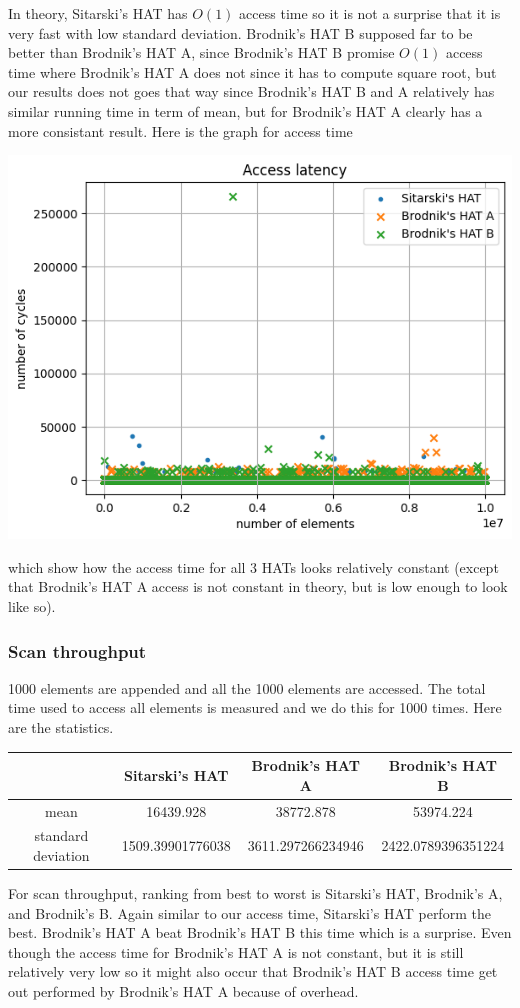 \documentclass{article} %
\begin{document}
    In theory, Sitarski's HAT has $O(1)$ access time so it is not a surprise that it is very fast with low standard deviation.
    Brodnik's HAT B supposed far to be better than Brodnik's HAT A, since Brodnik's HAT B promise $O(1)$ access time where
    Brodnik's HAT A does not since it has to compute square root, but our results does not goes that way since Brodnik's HAT B and A
    relatively has similar running time in term of mean, but for Brodnik's HAT A clearly has a more consistant result.
    Here is the graph for access time
    \begin{center}
        \includegraphics{graphics/hat_access.png}
    \end{center}
    which show how the access time for all 3 HATs looks relatively constant (except that Brodnik's HAT A access is not constant in theory, but is low enough to look like so).

    \subsubsection*{Scan throughput}
    1000 elements are appended and all the 1000 elements are accessed. The total time used to access all elements is measured and we do this for 1000 times.
    Here are the statistics.
    \begin{center}
        \begin{tabular}{|c|c|c|c|}\hline
        & Sitarski's HAT & Brodnik's HAT A & Brodnik's HAT B\\\hline
        mean &  16439.928 & 38772.878 & 53974.224\\\hline
        standard deviation & 1509.39901776038  & 3611.297266234946 & 2422.0789396351224\\\hline
        \end{tabular}
    \end{center}
    For scan throughput, ranking from best to worst is Sitarski's HAT, Brodnik's A, and Brodnik's B.
    Again similar to our access time, Sitarski's HAT perform the best. Brodnik's HAT A beat Brodnik's HAT B this time which is a
    surprise. Even though the access time for Brodnik's HAT A is not constant, but it is still relatively very low
    so it might also occur that Brodnik's HAT B access time get out performed by Brodnik's HAT A because of overhead.
\end{document}
